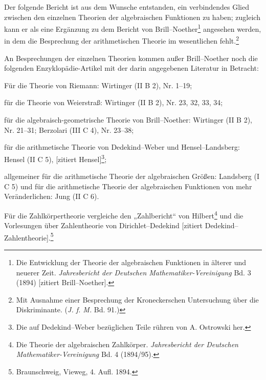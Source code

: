 \documentclass[11pt]{article}
\begin{document}
Der folgende Bericht ist aus dem Wunsche entstanden, ein verbindendes Glied zwischen den einzelnen Theorien der algebraischen Funktionen zu haben; zugleich kann er als eine Ergänzung zu dem Bericht von Brill--Noether\footnote{Die Entwicklung der Theorie der algebraischen Funktionen in älterer und neuerer Zeit. \emph{Jahresbericht der Deutschen Mathematiker-Vereinigung} Bd. 3 (1894) [zitiert Brill--Noether].} angesehen werden, in dem die Besprechung der arithmetischen Theorie im wesentlichen fehlt.\footnote{Mit Ausnahme einer Besprechung der Kroneckerschen Untersuchung über die Diskriminante. (\emph{J. f. M.} Bd. 91.)}

An Besprechungen der einzelnen Theorien kommen außer Brill--Noether noch die folgenden Enzyklopädie-Artikel mit der darin angegebenen Literatur in Betracht:

Für die Theorie von Riemann: Wirtinger (II B 2), Nr. 1--19;

für die Theorie von Weierstraß: Wirtinger (II B 2), Nr. 23, 32, 33, 34;

für die algebraisch-geometrische Theorie von Brill--Noether: Wirtinger (II B 2), Nr. 21--31; Berzolari (III C 4), Nr. 23--38;

für die arithmetische Theorie von Dedekind--Weber und Hensel--Landsberg: Hensel (II C 5), [zitiert Hensel]\footnote{Die auf Dedekind--Weber bezüglichen Teile rühren von A. Ostrowski her.};

allgemeiner für die arithmetische Theorie der algebraischen Größen: Landsberg (I C 5) und für die arithmetische Theorie der algebraischen Funktionen von mehr Veränderlichen: Jung (II C 6).

Für die Zahlkörpertheorie vergleiche den „Zahlbericht“ von Hilbert\footnote{Die Theorie der algebraischen Zahlkörper. \emph{Jahresbericht der Deutschen Mathematiker-Vereinigung} Bd. 4 (1894/95).} und die Vorlesungen über Zahlentheorie von Dirichlet--Dedekind [zitiert Dedekind--Zahlentheorie].\footnote{Braunschweig, Vieweg, 4. Aufl. 1894.}
\end{document}
